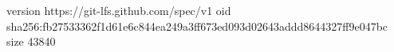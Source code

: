 version https://git-lfs.github.com/spec/v1
oid sha256:fb27533362f1d61e6c844ea249a3ff673ed093d02643addd8644327ff9e047bc
size 43840
